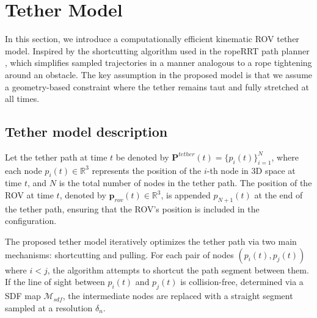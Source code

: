 \section{Tether Model}
\label{sec:tether_model}
In this section, we introduce a computationally efficient kinematic \ac{ROV} tether model. Inspired by the shortcutting algorithm used in the ropeRRT path planner \cite{roperrt}, which simplifies sampled trajectories in a manner analogous to a rope tightening around an obstacle. The key assumption in the proposed model is that we assume a geometry-based constraint where the tether remains taut and fully stretched at all times.

\subsection{Tether model description}
Let the tether path at time \( t \) be denoted by \( \mathbf{P}^{tether}(t) = \{ p_i(t) \}_{i=1}^{N} \), where each node \( p_i(t) \in \mathbb{R}^3 \) represents the position of the \( i \)-th node in 3D space at time \( t \), and \( N \) is the total number of nodes in the tether path. The position of the ROV at time \( t \), denoted by \( \mathbf{p}_{rov}(t) \in \mathbb{R}^3 \), is appended \( p_{N+1}(t) \) at the end of the tether path, ensuring that the ROV's position is included in the configuration. 

The proposed tether model iteratively optimizes the tether path via two main mechanisms: shortcutting and pulling. For each pair of nodes \( (p_i(t), p_j(t)) \) where \( i < j \), the algorithm attempts to shortcut the path segment between them. If the line of sight between \( p_i(t) \) and \( p_j(t) \) is collision-free, determined via a \ac{SDF} map \( \mathcal{M}_{sdf} \), the intermediate nodes are replaced with a straight segment sampled at a resolution \( \delta_n \).







